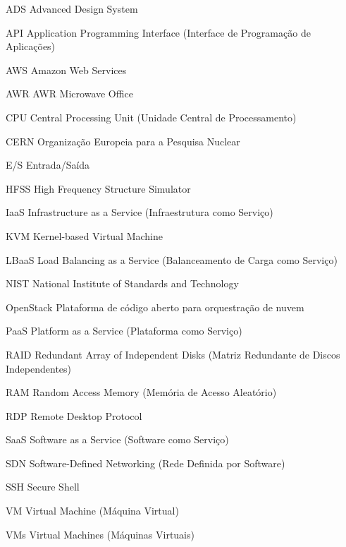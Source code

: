 \begin{siglas}
  \item[ADS] Advanced Design System
  \item[API] Application Programming Interface (Interface de Programação de Aplicações)
  \item[AWS] Amazon Web Services
  \item[AWR] AWR Microwave Office
  \item[CPU] Central Processing Unit (Unidade Central de Processamento)
  \item[CERN] Organização Europeia para a Pesquisa Nuclear
  \item[E/S] Entrada/Saída
  \item[HFSS] High Frequency Structure Simulator
  \item[IaaS] Infrastructure as a Service (Infraestrutura como Serviço)
  \item[KVM] Kernel-based Virtual Machine
  \item[LBaaS] Load Balancing as a Service (Balanceamento de Carga como Serviço)
  \item[NIST] National Institute of Standards and Technology
  \item[OpenStack] Plataforma de código aberto para orquestração de nuvem
  \item[PaaS] Platform as a Service (Plataforma como Serviço)
  \item[RAID] Redundant Array of Independent Disks (Matriz Redundante de Discos Independentes)
  \item[RAM] Random Access Memory (Memória de Acesso Aleatório)
  \item[RDP] Remote Desktop Protocol
  \item[SaaS] Software as a Service (Software como Serviço)
  \item[SDN] Software-Defined Networking (Rede Definida por Software)
  \item[SSH] Secure Shell
  \item[VM] Virtual Machine (Máquina Virtual)
  \item[VMs] Virtual Machines (Máquinas Virtuais)
\end{siglas}
